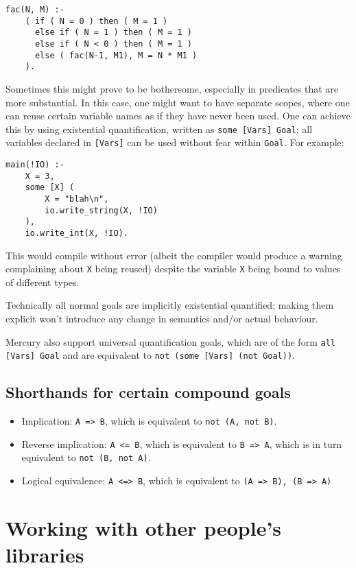 \begin{lstlisting}[language=Mercury]
fac(N, M) :-
	( if ( N = 0 ) then ( M = 1 )
	  else if ( N = 1 ) then ( M = 1 )
	  else if ( N < 0 ) then ( M = 1 )
	  else ( fac(N-1, M1), M = N * M1 )
	).
\end{lstlisting}

Sometimes this might prove to be bothersome, especially in predicates that are more substantial. In this case, one might want to have separate scopes, where one can reuse certain variable names as if they have never been used. One can achieve this by using existential quantification, written as \texttt{some [Vars] Goal}; all variables declared in \texttt{[Vars]} can be used without fear within \texttt{Goal}. For example:

\begin{lstlisting}[language=Mercury]
main(!IO) :-
	X = 3,
	some [X] (
		X = "blah\n",
		io.write_string(X, !IO)
	),
	io.write_int(X, !IO).
\end{lstlisting}

This would compile without error (albeit the compiler would produce a warning complaining about \texttt{X} being reused) despite the variable \texttt{X} being bound to values of different types.

Technically all normal goals are implicitly existential quantified; making them explicit won't introduce any change in semantics and/or actual behaviour.

Mercury also support universal quantification goals, which are of the form \texttt{all [Vars] Goal} and are equivalent to \texttt{not (some [Vars] (not Goal))}.

\subsection{Shorthands for certain compound goals}

\begin{itemize}
\item Implication: \texttt{A => B}, which is equivalent to \texttt{not (A, not B)}.
\item Reverse implication: \texttt{A <= B}, which is equivalent to \texttt{B => A}, which is in turn equivalent to \texttt{not (B, not A)}.
  \item Logical equivalence: \texttt{A <=> B}, which is equivalent to \texttt{(A => B), (B => A)}
\end{itemize}


\section{Working with other people's libraries}

